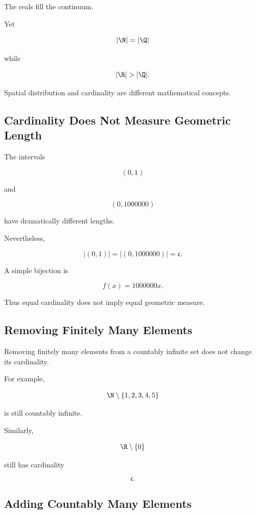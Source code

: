 The reals fill the continuum.

Yet

\[ |\N|=|\Q| \]

while

\[ |\R|>|\Q|. \]

Spatial distribution and cardinality are different mathematical concepts.

\subsection{Cardinality Does Not Measure Geometric Length}
\label{subsec:cardinality-not-length}

The intervals

\[ (0,1) \]

and

\[ (0,1000000) \]

have dramatically different lengths.

Nevertheless,

\[ |(0,1)|=|(0,1000000)|=\mathfrak c. \]

A simple bijection is

\[ f(x)=1000000x. \]

Thus equal cardinality does not imply equal geometric measure.

\subsection{Removing Finitely Many Elements}
\label{subsec:removing-finite-elements}

Removing finitely many elements from a countably infinite set does not change
its cardinality.

For example,

\[ \N\setminus\{1,2,3,4,5\} \]

is still countably infinite.

Similarly,

\[ \R\setminus\{0\} \]

still has cardinality

\[ \mathfrak c. \]

\subsection{Adding Countably Many Elements}
\label{subsec:adding-countably-many}

